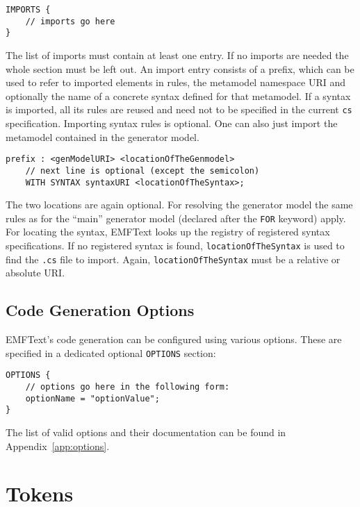 \begin{lstlisting}
IMPORTS {
    // imports go here
}
\end{lstlisting}

The list of imports must contain at least one entry. If no imports are 
needed the whole section must be left out. An import entry consists of a prefix, 
which can be used to refer to imported elements in rules, the metamodel
namespace URI and optionally the name of a concrete syntax defined for that
metamodel. If a syntax is imported, all its rules are reused and need not to be
specified in the current \texttt{cs} specification. Importing syntax rules is
optional. One can also just import the metamodel contained in the generator model.

\begin{lstlisting}
prefix : <genModelURI> <locationOfTheGenmodel>
    // next line is optional (except the semicolon) 
    WITH SYNTAX syntaxURI <locationOfTheSyntax>;
\end{lstlisting}

The two locations are again optional. For resolving the generator model the same
rules as for the ``main'' generator model (declared after the \texttt{FOR}
keyword) apply. For locating the syntax, EMFText looks up the registry of
registered syntax specifications. If no registered syntax is found, 
\texttt{locationOfTheSyntax} is used to find the \texttt{.cs} file to import.
Again, \texttt{locationOfTheSyntax} must be a relative or absolute URI.

\subsection{Code Generation Options}

EMFText's code generation can be configured using various options. These are
specified in a dedicated optional \texttt{OPTIONS} section:

\begin{lstlisting}
OPTIONS {
    // options go here in the following form:
    optionName = "optionValue";
}
\end{lstlisting}

The list of valid options and their documentation can be found in
Appendix~\ref{app:options}.

\section{Tokens}
\label{sec:tokens}

